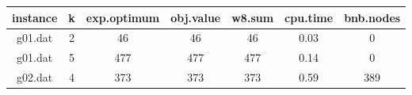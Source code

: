\begin{tabular}{ c | c | c | c | c | c | c }
	instance & k & exp.optimum & obj.value & w8.sum & cpu.time & bnb.nodes \\ 
	\hline
	g01.dat & 2 & 46 & 46 & 46 & 0.03 & 0 \\
	g01.dat & 5 & 477 & 477 & 477 & 0.14 & 0 \\
	g02.dat & 4 & 373 & 373 & 373 & 0.59 & 389 \\
\end{tabular}
